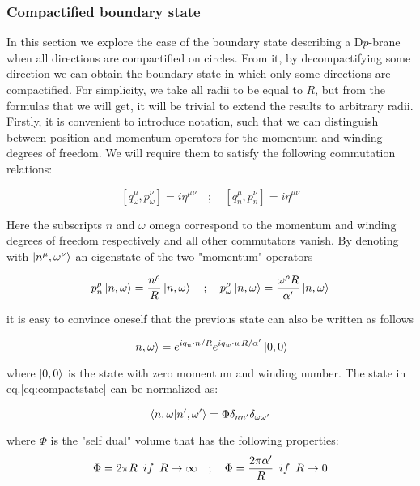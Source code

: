\subsubsection{Compactified boundary state}

In this section we explore the case of the boundary state describing a D$p$-brane when all directions are compactified on circles. From it, by decompactifying some direction we can obtain the boundary state in which only some directions are compactified. For simplicity, we take all radii to be equal to $R$, but from the formulas that we will get, it will be trivial to extend the results to arbitrary radii. Firstly, it is convenient to introduce notation, such that we can distinguish between position and momentum operators for the momentum and winding degrees of freedom. We will require them to satisfy the following commutation relations:

\begin{equation}
\left[q^\mu_\omega,p^\nu_\omega\right] = i\eta^{\mu\nu}\quad ;\quad \left[q^\mu_n,p^\nu_n\right] = i\eta^{\mu\nu}
\end{equation}

Here the subscripts $n$ and $\omega$ omega correspond to the momentum and winding degrees of freedom respectively and all other commutators vanish. By denoting with $\ket{n^\mu,\omega^\nu}$ an eigenstate of the two "momentum" operators

\begin{equation}
p^\rho_n\ket{n,\omega} = \frac{n^\rho}{R}\ket{n,\omega}\quad ; \quad p^\rho_\omega\ket{n,\omega} = \frac{\omega^\rho R}{\alpha'}\ket{n,\omega}
\end{equation}

it is easy to convince oneself that the previous state can also be written as follows

\begin{equation}
\ket{n,\omega} = e^{iq_n\cdot n/R}e^{iq_w\cdot wR/\alpha'}\ket{0,0}
\label{eq:compactstate}
\end{equation}
 
where $\ket{0,0}$ is the state with zero momentum and winding number. The state in eq.\eqref{eq:compactstate} can be normalized as:

\begin{equation}
\bra{n,\omega}\ket{n',\omega'} = \Phi \delta_{nn'}\delta_{\omega\omega'}
\end{equation}

where $\Phi$ is the "self dual" volume that has the following properties:
\begin{equation}
\Phi = 2\pi R \enskip if\enskip R\rightarrow\infty \quad ; \quad \Phi=\frac{2\pi\alpha'}{R} \enskip if\enskip R\rightarrow 0
\label{eq:selfdualvolume}
\end{equation}

